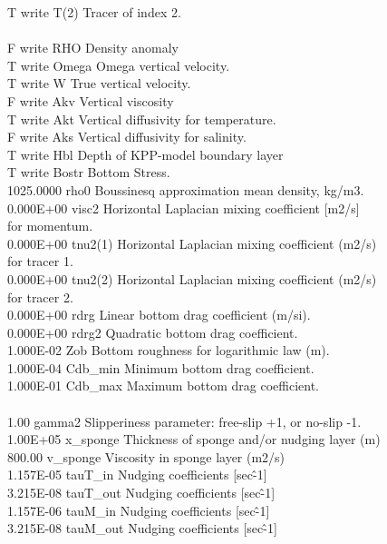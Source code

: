 T  write T(2)  Tracer of index 2.\\
\\
F  write RHO   Density anomaly\\
T  write Omega Omega vertical velocity.\\
T  write W     True vertical velocity.\\
F  write Akv   Vertical viscosity\\
T  write Akt   Vertical diffusivity for temperature.\\
F  write Aks   Vertical diffusivity for salinity.\\
T  write Hbl   Depth of KPP-model boundary layer\\
T  write Bostr Bottom Stress.\\
1025.0000  rho0     Boussinesq approximation mean density, kg/m3.\\
0.000E+00  visc2    Horizontal Laplacian mixing coefficient [m2/s]\\
for momentum.\\
0.000E+00  tnu2(1)  Horizontal Laplacian mixing coefficient (m2/s)\\
for tracer 1.\\
0.000E+00  tnu2(2)  Horizontal Laplacian mixing coefficient (m2/s)\\
for tracer 2.\\
0.000E+00  rdrg     Linear bottom drag coefficient (m/si).\\
0.000E+00  rdrg2    Quadratic bottom drag coefficient.\\
1.000E-02  Zob      Bottom roughness for logarithmic law (m).\\
1.000E-04  Cdb\_min  Minimum bottom drag coefficient.\\
1.000E-01  Cdb\_max  Maximum bottom drag coefficient.\\
\\
1.00  gamma2   Slipperiness parameter: free-slip +1, or no-slip -1.\\
1.00E+05  x\_sponge Thickness of sponge and/or nudging layer (m)\\
800.00  v\_sponge Viscosity in sponge layer (m2/s)\\
1.157E-05  tauT\_in  Nudging coefficients [sec\^-1]\\
3.215E-08  tauT\_out Nudging coefficients [sec\^-1]\\
1.157E-06  tauM\_in  Nudging coefficients [sec\^-1]\\
3.215E-08  tauM\_out Nudging coefficients [sec\^-1]\\
